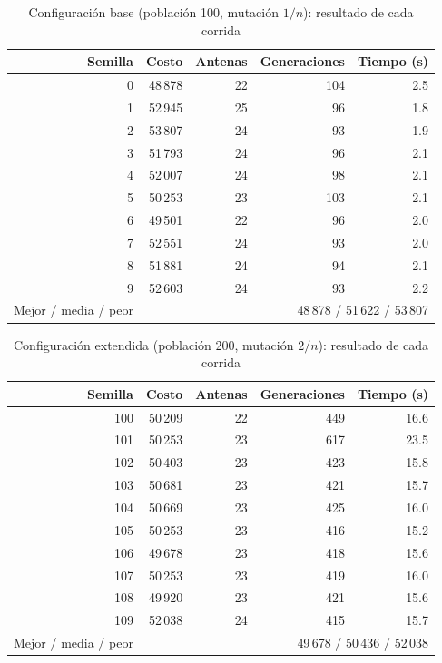 \begin{table}[H]
\centering
\caption{Configuración base (población 100, mutación $1/n$): resultado de cada corrida}
\label{tab:ap_base}
\begin{tabular}{rrrrr}
\toprule
Semilla & Costo & Antenas & Generaciones & Tiempo (s) \\
\midrule
0 & 48\,878 & 22 & 104 & 2.5 \\
1 & 52\,945 & 25 & 96 & 1.8 \\
2 & 53\,807 & 24 & 93 & 1.9 \\
3 & 51\,793 & 24 & 96 & 2.1 \\
4 & 52\,007 & 24 & 98 & 2.1 \\
5 & 50\,253 & 23 & 103 & 2.1 \\
6 & 49\,501 & 22 & 96 & 2.0 \\
7 & 52\,551 & 24 & 93 & 2.0 \\
8 & 51\,881 & 24 & 94 & 2.1 \\
9 & 52\,603 & 24 & 93 & 2.2 \\
\midrule
Mejor / media / peor & \multicolumn{4}{r}{48\,878 / 51\,622 / 53\,807} \\
\bottomrule
\end{tabular}
\end{table}
\begin{table}[H]
\centering
\caption{Configuración extendida (población 200, mutación $2/n$): resultado de cada corrida}
\label{tab:ap_ext}
\begin{tabular}{rrrrr}
\toprule
Semilla & Costo & Antenas & Generaciones & Tiempo (s) \\
\midrule
100 & 50\,209 & 22 & 449 & 16.6 \\
101 & 50\,253 & 23 & 617 & 23.5 \\
102 & 50\,403 & 23 & 423 & 15.8 \\
103 & 50\,681 & 23 & 421 & 15.7 \\
104 & 50\,669 & 23 & 425 & 16.0 \\
105 & 50\,253 & 23 & 416 & 15.2 \\
106 & 49\,678 & 23 & 418 & 15.6 \\
107 & 50\,253 & 23 & 419 & 16.0 \\
108 & 49\,920 & 23 & 421 & 15.6 \\
109 & 52\,038 & 24 & 415 & 15.7 \\
\midrule
Mejor / media / peor & \multicolumn{4}{r}{49\,678 / 50\,436 / 52\,038} \\
\bottomrule
\end{tabular}
\end{table}

